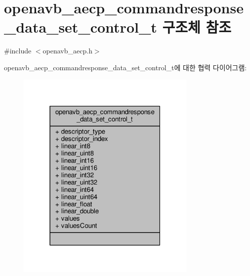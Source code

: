 \hypertarget{structopenavb__aecp__commandresponse__data__set__control__t}{}\section{openavb\+\_\+aecp\+\_\+commandresponse\+\_\+data\+\_\+set\+\_\+control\+\_\+t 구조체 참조}
\label{structopenavb__aecp__commandresponse__data__set__control__t}


{\ttfamily \#include $<$openavb\+\_\+aecp.\+h$>$}



openavb\+\_\+aecp\+\_\+commandresponse\+\_\+data\+\_\+set\+\_\+control\+\_\+t에 대한 협력 다이어그램\+:
\nopagebreak
\begin{figure}[H]
\begin{center}
\leavevmode
\includegraphics[width=247pt]{structopenavb__aecp__commandresponse__data__set__control__t__coll__graph}
\end{center}
\end{figure}
